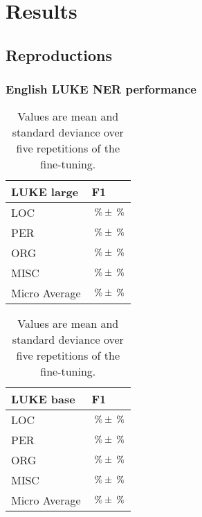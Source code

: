 \documentclass[main.tex]{subfiles}
\begin{document}
\chapter{Results}

\section{Reproductions}
\subsection{English LUKE NER performance}
\begin{table}[H]
    \begin{tabular}{ll}
        LUKE  large& F1\\\hline
        LOC             & $\:\text{\%{}} \pm \:\text{\%{}}$       \\
        PER             & $\:\text{\%{}} \pm \:\text{\%{}}$      \\
        ORG             & $\:\text{\%{}} \pm \:\text{\%{}}$       \\
        MISC            & $\:\text{\%{}} \pm \:\text{\%{}}$           \\\hline
        Micro Average   & $\:\text{\%{}} \pm \:\text{\%{}}$ 
    \end{tabular}
    \quad
    \begin{tabular}{ll}
        LUKE base & F1\\\hline
        LOC             & $\:\text{\%{}} \pm \:\text{\%{}}$       \\
        PER             & $\:\text{\%{}} \pm \:\text{\%{}}$      \\
        ORG             & $\:\text{\%{}} \pm \:\text{\%{}}$       \\
        MISC            & $\:\text{\%{}} \pm \:\text{\%{}}$           \\\hline
        Micro Average   & $\:\text{\%{}} \pm \:\text{\%{}}$ 
    \end{tabular}
    \caption{
        Values are mean and standard deviance over five repetitions of the fine-tuning.
    }
\end{table}
\end{document}
